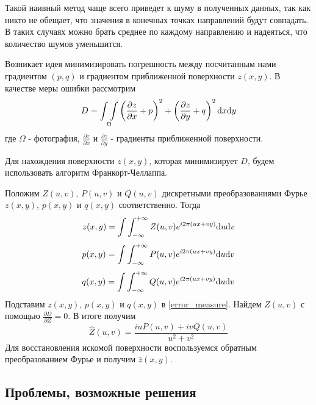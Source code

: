 Такой наивный метод чаще всего приведет к шуму в полученных данных,
так как никто не обещает, что значения в конечных точках направлений
будут совпадать. В таких случаях можно брать среднее по каждому направлению
и надеяться, что количество шумов уменьшится.

Возникает идея минимизировать погрешность между посчитанным нами
градиентом $(p,q)$ и градиентом приближенной поверхности $z(x,y)$.
В качестве меры ошибки рассмотрим
\begin{equation}\label{error_measure}
  D=\underset{\Omega}{\int\int}\left(\frac{\partial z}{\partial x}+p\right)^2+\left(\frac{\partial z}{\partial y}+q\right)^2\mathrm{d} x\mathrm{d} y
\end{equation}
где $\Omega$ - фотография, $\frac{\partial z}{\partial x}$ и $\frac{\partial z}{\partial y}$ - градиенты
приближенной поверхности.

Для нахождения поверхности $z(x,y)$, которая минимизирует $D$, будем использовать
алгоритм Франкорт-Челлаппа.

Положим $Z(u,v)$, $P(u,v)$ и $Q(u,v)$ дискретными преобразованиями Фурье
$z(x,y)$, $p(x,y)$ и $q(x,y)$ соответственно. Тогда
\[ z(x,y) = \int\int_{-\infty}^{+\infty}Z(u,v)e^{i2\pi(ux+vy)}\mathrm{d} u\mathrm{d} v \]
\[ p(x,y) = \int\int_{-\infty}^{+\infty}P(u,v)e^{i2\pi(ux+vy)}\mathrm{d} u\mathrm{d} v \]
\[ q(x,y) = \int\int_{-\infty}^{+\infty}Q(u,v)e^{i2\pi(ux+vy)}\mathrm{d} u\mathrm{d} v \]
Подставим $z(x,y)$, $p(x,y)$ и $q(x,y)$ в \eqref{error_measure}.
Найдем $Z(u,v)$ с помощью $\frac{\partial D}{\partial Z}=0$.
В итоге получим
\[ \hat{Z}(u,v)=\frac{iuP(u,v)+ivQ(u,v)}{u^2+v^2} \]
Для восстановления искомой поверхности воспользуемся обратным преобразованием
Фурье и получим $\hat{z}(x,y)$.

\newpage

\subsection{Проблемы, возможные решения}

